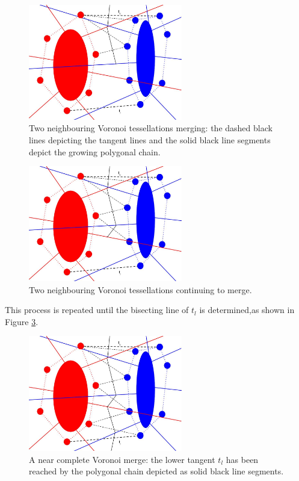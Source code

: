 \begin{figure}[H]
\centering
\includegraphics[width=0.6\textwidth]{Images/v_merge2.jpg}
\caption{Two neighbouring Voronoi tessellations merging: the dashed black lines depicting the tangent lines and the solid black line segments depict the growing polygonal chain.}
\label{fig:v_merge2}
\end{figure}
\begin{figure}[H]
\centering
\includegraphics[width=0.6\textwidth]{Images/v_merge3.jpg}
\caption{Two neighbouring Voronoi tessellations continuing to merge.}
\label{fig:v_merge3}
\end{figure}
This process is repeated until the bisecting line of $t_l$ is determined,as shown in Figure \ref{fig:v_merge4}.
\begin{figure}[H]
\centering
\includegraphics[width=0.6\textwidth]{Images/v_merge4.jpg}
\caption{A near complete Voronoi merge: the lower tangent $t_l$ has been reached by the polygonal chain depicted as solid black line segments.}
\label{fig:v_merge4}
\end{figure}
